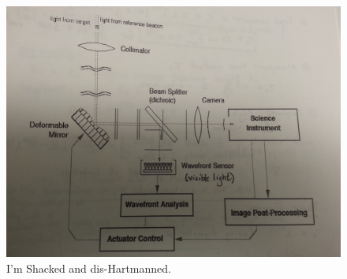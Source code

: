 \begin{figure}[!h]
\begin{center}
\includegraphics[width=\textwidth]{AO.jpg}
\end{center}
\caption{I'm Shacked and dis-Hartmanned.
\label{fig:AO}}
\end{figure}


